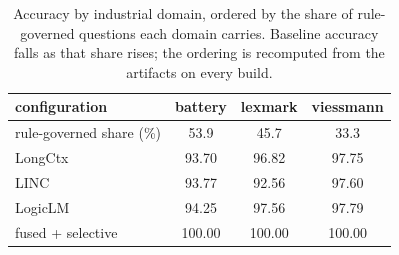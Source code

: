 \begin{table}[t]
\caption{Accuracy by industrial domain, ordered by the share of rule-governed questions each domain carries. Baseline accuracy falls as that share rises; the ordering is recomputed from the artifacts on every build.}
\label{tab:domain}
\centering\footnotesize
\setlength{\tabcolsep}{5pt}
\begin{tabular}{lccc}
\toprule
configuration & battery & lexmark & viessmann \\
\midrule
rule-governed share (\%) & 53.9 & 45.7 & 33.3 \\
\midrule
LongCtx & 93.70 & 96.82 & 97.75 \\
LINC & 93.77 & 92.56 & 97.60 \\
LogicLM & 94.25 & 97.56 & 97.79 \\
\midrule
fused + selective & 100.00 & 100.00 & 100.00 \\
\bottomrule
\end{tabular}
\end{table}
